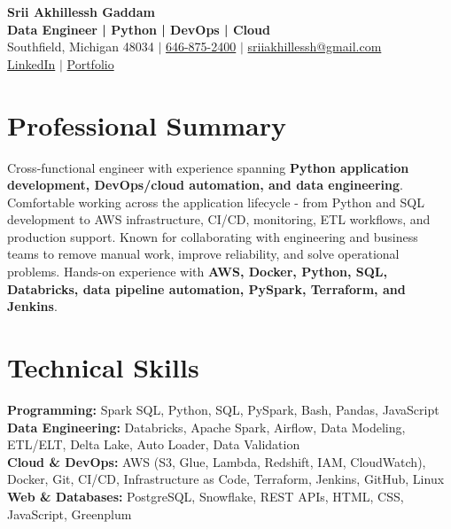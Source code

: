 \documentclass[letterpaper,10pt]{article}
\begin{document}
\fontsize{9.35pt}{10.45pt}\selectfont

\begin{center}
    {\LARGE \textbf{Srii Akhillessh Gaddam}} \\[-1pt]
    \textbf{Data Engineer | Python | DevOps | Cloud} \\[2pt]
    Southfield, Michigan 48034 $|$
    \href{tel:6468752400}{646-875-2400} $|$
    \href{mailto:sriiakhillessh@gmail.com}{sriiakhillessh@gmail.com} \\[1pt]
    \href{https://www.linkedin.com/in/srii-akhiilessh-gaddam-b48668191/}{LinkedIn} $|$
    \href{https://sriiakhillesshg.github.io/portfolio/}{Portfolio}
\end{center}
\vspace{-8pt}

\section{Professional Summary}
\small{Cross-functional engineer with experience spanning \textbf{Python application development, DevOps/cloud automation, and data engineering}. Comfortable working across the application lifecycle - from Python and SQL development to AWS infrastructure, CI/CD, monitoring, ETL workflows, and production support. Known for collaborating with engineering and business teams to remove manual work, improve reliability, and solve operational problems. Hands-on experience with \textbf{AWS, Docker, Python, SQL, Databricks, data pipeline automation, PySpark, Terraform, and Jenkins}.}

\section{Technical Skills}
\small{
\textbf{Programming:} Spark SQL, Python, SQL, PySpark, Bash, Pandas, JavaScript \\
\textbf{Data Engineering:} Databricks, Apache Spark, Airflow, Data Modeling, ETL/ELT, Delta Lake, Auto Loader, Data Validation \\
\textbf{Cloud \& DevOps:} AWS (S3, Glue, Lambda, Redshift, IAM, CloudWatch), Docker, Git, CI/CD, Infrastructure as Code, Terraform, Jenkins, GitHub, Linux \\
\textbf{Web \& Databases:} PostgreSQL, Snowflake, REST APIs, HTML, CSS, JavaScript, Greenplum
}
\end{document}
